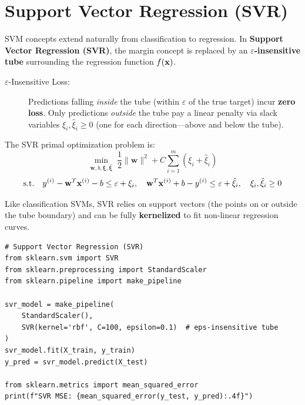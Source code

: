 \section*{Support Vector Regression (SVR)}

SVM concepts extend naturally from classification to regression. In \textbf{Support Vector Regression (SVR)}, the margin concept is replaced by an \textbf{$\varepsilon$-insensitive tube} surrounding the regression function $f(\mathbf{x})$.

\begin{description}
    \item[$\varepsilon$-Insensitive Loss:] Predictions falling \textit{inside} the tube (within $\varepsilon$ of the true target) incur \textbf{zero loss}. Only predictions \textit{outside} the tube pay a linear penalty via slack variables $\xi_i, \hat{\xi}_i \geq 0$ (one for each direction---above and below the tube).
\end{description}

The SVR primal optimization problem is:
$$\min_{\mathbf{w}, b, \boldsymbol{\xi}, \hat{\boldsymbol{\xi}}} \;\frac{1}{2}\|\mathbf{w}\|^2 + C \sum_{i=1}^{m} (\xi_i + \hat{\xi}_i)$$
$$\text{s.t.} \quad y^{(i)} - \mathbf{w}^T\mathbf{x}^{(i)} - b \leq \varepsilon + \xi_i, \quad \mathbf{w}^T\mathbf{x}^{(i)} + b - y^{(i)} \leq \varepsilon + \hat{\xi}_i, \quad \xi_i, \hat{\xi}_i \geq 0$$

Like classification SVMs, SVR relies on support vectors (the points on or outside the tube boundary) and can be fully \textbf{kernelized} to fit non-linear regression curves.

\begin{lstlisting}[style=pythonstyle]
# Support Vector Regression (SVR)
from sklearn.svm import SVR
from sklearn.preprocessing import StandardScaler
from sklearn.pipeline import make_pipeline

svr_model = make_pipeline(
    StandardScaler(),
    SVR(kernel='rbf', C=100, epsilon=0.1)  # eps-insensitive tube
)
svr_model.fit(X_train, y_train)
y_pred = svr_model.predict(X_test)

from sklearn.metrics import mean_squared_error
print(f"SVR MSE: {mean_squared_error(y_test, y_pred):.4f}")
\end{lstlisting}
